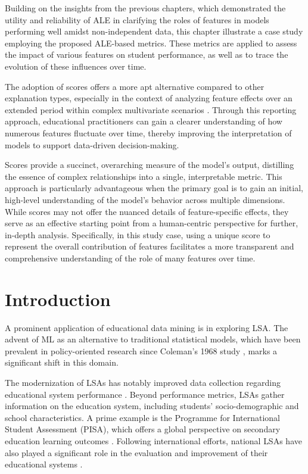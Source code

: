 Building on the insights from the previous chapters, which demonstrated the utility and reliability of \gls{ALE} in clarifying the roles of features in models performing well amidst non-independent data, this chapter illustrate a case study employing the proposed ALE-based metrics. These metrics are applied to assess the impact of various features on student performance, as well as to trace the evolution of these influences over time. 

The adoption of scores offers a more apt alternative compared to other explanation types, especially in the context of analyzing feature effects over an extended period within complex multivariate scenarios \cite{SilvaFilho2023AAchievement}. Through this reporting approach, educational practitioners can gain a clearer understanding of how numerous features fluctuate over time, thereby improving the interpretation of models to support data-driven decision-making.

Scores provide a succinct, overarching measure of the model's output, distilling the essence of complex relationships into a single, interpretable metric. This approach is particularly advantageous when the primary goal is to gain an initial, high-level understanding of the model's behavior across multiple dimensions. While scores may not offer the nuanced details of feature-specific effects, they serve as an effective starting point from a human-centric perspective for further, in-depth analysis. Specifically, in this study case, using a unique score to represent the overall contribution of features facilitates a more transparent and comprehensive understanding of the role of many features over time.

\section{Introduction}

A prominent application of educational data mining is in exploring \gls{LSA}. The advent of \gls{ML} as an alternative to traditional statistical models, which have been prevalent in policy-oriented research since Coleman's 1968 study \cite{coleman1968equality}, marks a significant shift in this domain.

The modernization of \gls{LSA}s has notably improved data collection regarding educational system performance \cite{Hernandez-Torrano2021ModernLiteratureb}. Beyond performance metrics, \gls{LSA}s gather information on the education system, including students' socio-demographic and school characteristics. A prime example is the Programme for International Student Assessment (PISA), which offers a global perspective on secondary education learning outcomes \cite{VarkeyFoundation2018GlobalSTATISTICS}. Following international efforts, national \gls{LSA}s have also played a significant role in the evaluation and improvement of their educational systems \cite{Johansson2016InternationalConsequences}.

